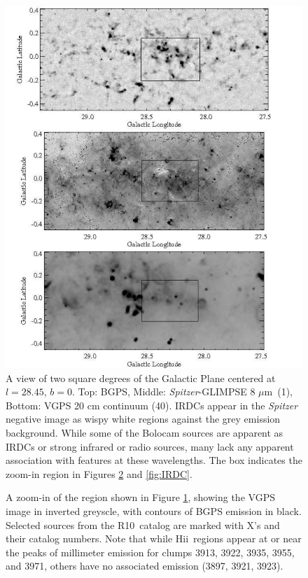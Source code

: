\documentclass[12pt,preprint]{aastex}
\newcommand{\hii}{H{\sc ii}}
\newcommand{\mum}{\ensuremath{\mu \mathrm{m}}}
\newcommand{\lon}{\ensuremath{l}}
\newcommand\Ros{R10}
\def\Figure#1#2#3#4{
\begin{figure}[htb]
\epsscale{#4}
\plotone{#1}
\caption{#2}
\label{#3}
\end{figure}
}
\begin{document}
\begin{figure}
  \begin{center}
  \includegraphics[scale=0.8]{f20}
  \end{center}

   \caption{A view of two square degrees of the Galactic Plane
    centered at $\lon=28.45$, $b=0$.  Top: BGPS, Middle: {\em
    Spitzer}-GLIMPSE 8 \mum\ (1), Bottom: VGPS 20 cm continuum
    (40\arcsec).  IRDCs appear in the {\em Spitzer} negative image as
    wispy white regions against the grey emission background.  While
    some of the Bolocam sources are apparent as IRDCs or strong
    infrared or radio sources, many lack any apparent association with
    features at these wavelengths.  The box indicates the zoom-in
    region in Figures \ref{fig:HII} and \ref{fig:IRDC}.}

  \label{fig:Multiwavelength}

\end{figure}

\Figure{f21} {A zoom-in of the region shown in Figure
\ref{fig:Multiwavelength}, showing the VGPS image in inverted
greyscle, with contours of BGPS emission in black.  Selected sources
from the \Ros\ catalog are marked with X's and their catalog numbers.
Note that while \hii\ regions appear at or near the peaks of
millimeter emission for clumps 3913, 3922, 3935, 3955, and 3971,
others have no associated emission (3897, 3921, 3923).}{fig:HII}{1.0}
\end{document}
